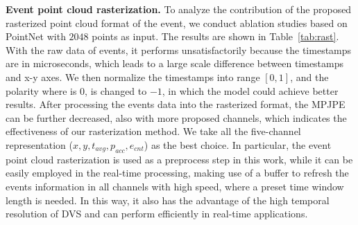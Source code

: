 \documentclass[10pt,twocolumn,letterpaper]{article}
\begin{document}
\begin{table}[t]
   \caption{\textbf{Event point cloud rasterization ablations.}}
   \label{tab:rast}
   \centering
   \renewcommand\arraystretch{1.54}{}
         \vspace{-1.5em}
\end{table}
\noindent\textbf{Event point cloud rasterization.}
To analyze the contribution of the proposed rasterized point cloud format of the event, we conduct ablation studies based on PointNet with $2048$ points as input.
The results are shown in Table~\ref{tab:rast}.
With the raw data of events, it performs unsatisfactorily because the timestamps are in microseconds, which leads to a large scale difference between timestamps and x-y axes.
We then normalize the timestamps into range $[0, 1]$, and the polarity where is $0$, is changed to ${-}1$, in which the model could achieve better results.
After processing the events data into the rasterized format, the MPJPE can be further decreased, also with more proposed channels, which indicates the effectiveness of our rasterization method. We take all the five-channel representation ($x,y,t_{avg},p_{acc},e_{cnt}$) as the best choice.
In particular, the event point cloud rasterization is used as a preprocess step in this work, while it can be easily employed in the real-time processing, making use of a buffer to refresh the events information in all channels with high speed, where a preset time window length is needed.
In this way, it also has the advantage of the high temporal resolution of DVS and can perform efficiently in real-time applications.
\end{document}

